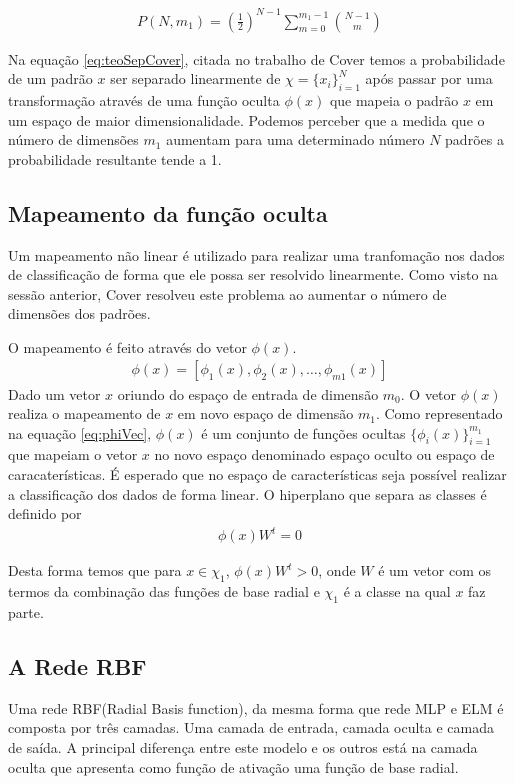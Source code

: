 \documentclass[
	article,			%
	11pt,				%
	oneside,			%
	a4paper,			%
	english,			%
	brazil,				%
	sumario=tradicional
	]{abntex2}
\begin{document}
\begin{align}
P(N,m_1) = \left(\frac{1}{2}\right)^{N-1}   
\sum_{m=0}^{m_1-1}   
\binom{N-1}{m}
\label{eq:teoSepCover}
\end{align}

Na equação \ref{eq:teoSepCover}, citada no trabalho de Cover temos a
probabilidade de um padrão $x$ ser separado linearmente de $\chi=\{x_i\}_{i=1}^{N}$ após passar por uma
transformação através de uma função oculta $\phi(x)$ que mapeia o padrão $x$ em
um espaço de maior dimensionalidade.
Podemos perceber que a medida que o número de dimensões $m_1$ aumentam para uma
determinado número $N$ padrões a probabilidade resultante tende a 1.


\subsection{Mapeamento da função oculta}
Um mapeamento não linear é utilizado para realizar uma tranfomação nos dados de
classificação de forma que ele possa ser resolvido linearmente. Como visto na
sessão anterior, Cover resolveu este problema ao aumentar o número de dimensões
dos padrões.

O mapeamento é feito através do vetor $\phi(x)$.
\begin{align}
\phi(x) = [ \phi_1(x), \phi_2(x), \ldots, \phi_{m1}(x) ] 
\label{eq:phiVec}
\end{align}
Dado um vetor $x$ oriundo do espaço de entrada de dimensão $m_0$. O vetor
$\phi(x)$ realiza o mapeamento de $x$ em novo espaço de dimensão $m_1$. Como
representado na equação \ref{eq:phiVec}, $\phi(x)$ é um conjunto de funções
ocultas $\{\phi_i(x)\}^{m_1}_{i=1}$ que mapeiam o vetor $x$ no novo espaço
denominado espaço oculto ou espaço de caracaterísticas. É esperado que no espaço
de características seja possível realizar a classificação dos dados de forma
linear. O hiperplano que separa as classes é definido por
\begin{align}
\phi(x)W^t=0
\end{align} 

Desta forma temos que para $x \in \chi_1 $, $\phi(x)W^t>0$, onde $W$ é um
vetor com os termos da combinação das funções de base radial e $\chi_1$ é a
classe na qual $x$ faz parte.

\subsection{A Rede RBF}
Uma rede RBF(Radial Basis function), da mesma forma que rede MLP e ELM é
composta por três camadas.
Uma camada de entrada, camada oculta e camada de saída. A principal diferença entre
este modelo e os outros está na camada oculta que apresenta como função de
ativação uma função de base radial.
\end{document}
